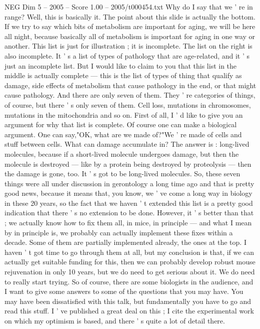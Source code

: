\begin{textsample}{NEG Dim 5 – 2005 – Score 1.00 – 2005/t000454.txt}
Why do I say that we ' re in range?
Well, this is basically it.
The point about this slide is actually the bottom.
If we try to say which bits of metabolism are important for aging, we will be here all night, because basically all of metabolism is important for aging in one way or another.
This list is just for illustration ; it is incomplete.
The list on the right is also incomplete.
It ' s a list of types of pathology that are age-related, and it ' s just an incomplete list.
But I would like to claim to you that this list in the middle is actually complete — this is the list of types of thing that qualify as damage, side effects of metabolism that cause pathology in the end, or that might cause pathology.
And there are only seven of them.
They ' re categories of things, of course, but there ' s only seven of them.
Cell loss, mutations in chromosomes, mutations in the mitochondria and so on.
First of all, I ' d like to give you an argument for why that list is complete.
Of course one can make a biological argument.
One can say,"OK, what are we made of?"We ' re made of cells and stuff between cells.
What can damage accumulate in?
The answer is : long-lived molecules, because if a short-lived molecule undergoes damage, but then the molecule is destroyed — like by a protein being destroyed by proteolysis — then the damage is gone, too.
It ' s got to be long-lived molecules.
So, these seven things were all under discussion in gerontology a long time ago and that is pretty good news, because it means that, you know, we ' ve come a long way in biology in these 20 years, so the fact that we haven ' t extended this list is a pretty good indication that there ' s no extension to be done.
However, it ' s better than that ; we actually know how to fix them all, in mice, in principle — and what I mean by in principle is, we probably can actually implement these fixes within a decade.
Some of them are partially implemented already, the ones at the top.
I haven ' t got time to go through them at all, but my conclusion is that, if we can actually get suitable funding for this, then we can probably develop robust mouse rejuvenation in only 10 years, but we do need to get serious about it.
We do need to really start trying.
So of course, there are some biologists in the audience, and I want to give some answers to some of the questions that you may have.
You may have been dissatisfied with this talk, but fundamentally you have to go and read this stuff.
I ' ve published a great deal on this ; I cite the experimental work on which my optimism is based, and there ' s quite a lot of detail there.

\end{textsample}
